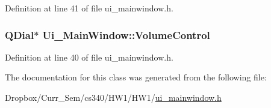 Definition at line 41 of file ui\-\_\-mainwindow.\-h.

\hypertarget{class_ui___main_window_a28c6790b1ca7f5d79927f26c7d7750ef}{
\subsubsection[{Volume\-Control}]{\setlength{\rightskip}{0pt plus 5cm}Q\-Dial$\ast$ Ui\-\_\-\-Main\-Window\-::\-Volume\-Control}}\label{class_ui___main_window_a28c6790b1ca7f5d79927f26c7d7750ef}


Definition at line 40 of file ui\-\_\-mainwindow.\-h.



The documentation for this class was generated from the following file\-:\begin{DoxyCompactItemize}
\item 
Dropbox/\-Curr\-\_\-\-Sem/cs340/\-H\-W1/\-H\-W1/\hyperlink{ui__mainwindow_8h}{ui\-\_\-mainwindow.\-h}\end{DoxyCompactItemize}
